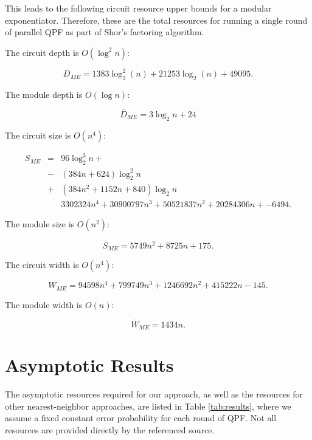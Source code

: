 \documentclass[twoside]{article}
\begin{document}
This leads to the following circuit resource upper bounds for a modular exponentiator. Therefore, these are the total resources for running a
single round of parallel QPF as part of Shor's factoring algorithm.

The circuit depth is $O(\log^2 n)$:

\begin{equation}
D_{ME} = 1383\log_2^2(n) + 21253\log_2(n) + 49095\text{.}
\end{equation}

The module depth is $O(\log n)$:

\begin{equation}
\overline{D}_{ME} = 3\log_2 n + 24
\end{equation}

The circuit size is $O(n^4)$:

\begin{eqnarray}
S_{ME} & = & 96 \log_2^3 n + \nonumber \\
       & - & (384n + 624)\log_2^2 n \nonumber \\
       & + & (384n^2 + 1152n + 840) \log_2 n \nonumber \\
       &   & 3302324 n^4 + 30900797 n^3 + 50521837 n^2  + 20284306 n + 
  -6494\text{.}
\end{eqnarray}

The module size is $O(n^2)$:

\begin{equation}
\overline{S}_{ME} = 5749n^2 + 8725n +175\text{.}
\end{equation}

The circuit width is $O(n^4)$:

\begin{equation}
W_{ME} = 94598n^4 + 799749 n^3 + 1246692 n^2 + 415222 n - 145\text{.}
\end{equation}

The module width is $O(n)$:

\begin{equation}
\overline{W}_{ME} = 1434n\text{.}
\end{equation}

%
\section{Asymptotic Results}
\label{sec:results}

The asymptotic resources required for our approach,
as well as the resources for other nearest-neighbor approaches,
are listed in Table \ref{tab:results},
where we assume a fixed constant error
probability for each round of QPF. Not all resources are
provided directly by the referenced source.
\end{document}
